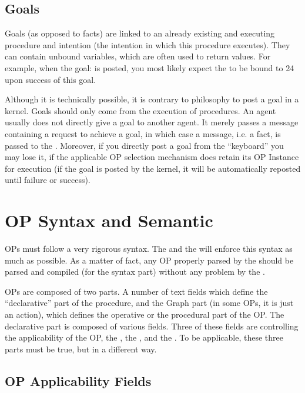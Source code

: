 \section{Goals}

Goals (as opposed to facts) are linked to an already existing and executing
procedure and intention (the intention in which this procedure executes).  They
can contain unbound variables, which are often used to return values.  For
example, when the goal:  is posted, you most likely
expect the  to be bound to 24 upon success of this goal.

Although it is technically possible, it is contrary to \OPRS{} philosophy to
post a goal in a kernel. Goals should only come from the execution of
procedures. An agent usually does not directly give a goal to another agent. It
merely passes a message containing a request to achieve a goal, in which case a
message, i.e. a fact, is passed to the \CPK{}.  Moreover, if you directly post
a goal from the ``keyboard'' you may lose it, if the applicable OP selection
mechanism does retain its OP Instance for execution (if the goal is posted by
the kernel, it will be automatically reposted until failure or success).

\chapter{OP Syntax and Semantic}

OPs must follow a very rigorous syntax. The \OPE{} and the \CPK{} will
enforce this syntax as much as possible. As a matter of fact, any OP
properly parsed by the \OPE{} should be parsed and compiled (for the
syntax part) without any problem by the \CPK{}.

OPs are composed of two parts. A number of text fields which define the
``declarative'' part of the procedure, and the Graph part (in some OPs, it is
just an action), which defines the operative or the procedural part of the OP.
The declarative part is composed of various fields. Three of these fields are
controlling the applicability of the OP, the , the
, and the . To be applicable, these three
parts must be true, but in a different way.



\section{OP Applicability Fields}

